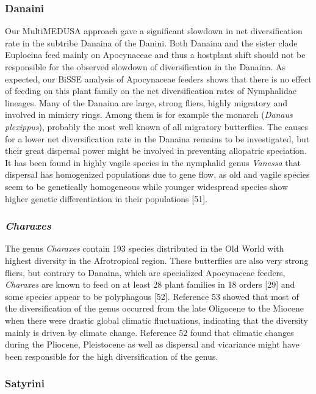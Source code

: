 \documentclass[10pt]{article}
\begin{document}
\subsubsection*{Danaini}

Our MultiMEDUSA approach gave a significant slowdown in net
diversification rate in the subtribe Danaina of the Danini. Both Danaina
and the sister clade Euploeina feed mainly on Apocynaceae and thus a
hostplant shift should not be responsible for the observed slowdown of
diversification in the Danaina. As expected, our BiSSE analysis of
Apocynaceae feeders shows that there is no effect of feeding on this
plant family on the net diversification rates of Nymphalidae lineages.
Many of the Danaina are large, strong fliers, highly migratory and
involved in mimicry rings. Among them is for example the monarch
(\emph{Danaus plexippus}), probably the most well known of all migratory
butterflies. The causes for a lower net diversification rate in the
Danaina remains to be investigated, but their great dispersal power
might be involved in preventing allopatric speciation. It has been found
in highly vagile species in the nymphalid genus \emph{Vanessa} that
dispersal has homogenized populations due to gene flow, as old and
vagile species seem to be genetically homogeneous while younger
widespread species show higher genetic differentiation in their
populations {[}51{]}.

\subsubsection*{\emph{Charaxes}}

The genus \emph{Charaxes} contain 193 species distributed in the Old
World with highest diversity in the Afrotropical region. These
butterflies are also very strong fliers, but contrary to Danaina, which
are specialized Apocynaceae feeders, \emph{Charaxes} are known to feed
on at least 28 plant families in 18 orders {[}29{]} and some species
appear to be polyphagous {[}52{]}. Reference 53 showed that most of the
diversification of the genus occurred from the late Oligocene to the
Miocene when there were drastic global climatic fluctuations, indicating
that the diversity mainly is driven by climate change. Reference 52
found that climatic changes during the Pliocene, Pleistocene as well as
dispersal and vicariance might have been responsible for the high
diversification of the genus.

\subsubsection*{Satyrini}
\end{document}
